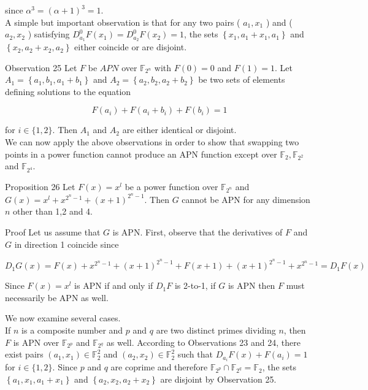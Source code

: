 \documentclass[10pt]{article}
\begin{document}
since $\alpha^{3}=(\alpha+1)^{3}=1$.\\
A simple but important observation is that for any two pairs ( $a_{1}, x_{1}$ ) and ( $a_{2}, x_{2}$ ) satisfying $D_{a_{1}}^{0} F\left(x_{1}\right)=D_{a_{2}}^{0} F\left(x_{2}\right)=1$, the sets $\left\{x_{1}, a_{1}+x_{1}, a_{1}\right\}$ and $\left\{x_{2}, a_{2}+x_{2}, a_{2}\right\}$ either coincide or are disjoint.

Observation 25 Let $F$ be $A P N$ over $\mathbb{F}_{2^{n}}$ with $F(0)=0$ and $F(1)=1$. Let $A_{1}= \left\{a_{1}, b_{1}, a_{1}+b_{1}\right\}$ and $A_{2}=\left\{a_{2}, b_{2}, a_{2}+b_{2}\right\}$ be two sets of elements defining solutions to the equation


\begin{equation*}
F\left(a_{i}\right)+F\left(a_{i}+b_{i}\right)+F\left(b_{i}\right)=1 \tag{35}
\end{equation*}


for $i \in\{1,2\}$. Then $A_{1}$ and $A_{2}$ are either identical or disjoint.\\
We can now apply the above observations in order to show that swapping two points in a power function cannot produce an APN function except over $\mathbb{F}_{2}, \mathbb{F}_{2^{2}}$ and $\mathbb{F}_{2^{4}}$.

Proposition 26 Let $F(x)=x^{l}$ be a power function over $\mathbb{F}_{2^{n}}$ and $G(x)=x^{l}+x^{2^{n}-1}+ (x+1)^{2^{n}-1}$. Then $G$ cannot be APN for any dimension $n$ other than 1,2 and 4.

Proof Let us assume that $G$ is APN. First, observe that the derivatives of $F$ and $G$ in direction 1 coincide since

$$
D_{1} G(x)=F(x)+x^{2^{n}-1}+(x+1)^{2^{n}-1}+F(x+1)+(x+1)^{2^{n}-1}+x^{2^{n}-1}=D_{1} F(x)
$$

Since $F(x)=x^{l}$ is APN if and only if $D_{1} F$ is 2-to-1, if $G$ is APN then $F$ must necessarily be APN as well.

We now examine several cases.\\
If $n$ is a composite number and $p$ and $q$ are two distinct primes dividing $n$, then $F$ is APN over $\mathbb{F}_{2^{p}}$ and $\mathbb{F}_{2^{q}}$ as well. According to Observations 23 and 24, there exist pairs $\left(a_{1}, x_{1}\right) \in \mathbb{F}_{2}^{2}$ and $\left(a_{2}, x_{2}\right) \in \mathbb{F}_{2}^{2}$ such that $D_{a_{i}} F(x)+F\left(a_{i}\right)=1$ for $i \in\{1,2\}$. Since $p$ and $q$ are coprime and therefore $\mathbb{F}_{2^{p}} \cap \mathbb{F}_{2^{q}}=\mathbb{F}_{2}$, the sets $\left\{a_{1}, x_{1}, a_{1}+x_{1}\right\}$ and $\left\{a_{2}, x_{2}, a_{2}+x_{2}\right\}$ are disjoint by Observation 25.
\end{document}
